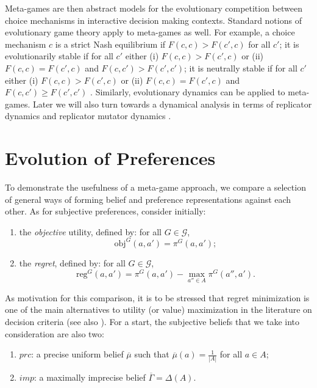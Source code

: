\documentclass[fleqn,reqno,12pt]{article}
\theoremstyle{Satz}
\theoremstyle{Bsp}
\begin{document}
Meta-games are then abstract models for the evolutionary competition between choice mechanisms
in interactive decision making contexts.  Standard notions of evolutionary game theory apply to
meta-games as well. For example, a choice mechanism $c$ is a strict Nash equilibrium if
$F(c,c) > F(c',c)$ for all $c'$; it is evolutionarily stable if for all $c'$ either (i)
$F(c,c) > F(c',c)$ or (ii) $F(c,c) = F(c',c)$ and $F(c,c') > F(c',c')$; it is neutrally stable
if for all $c'$ either (i) $F(c,c) > F(c',c)$ or (ii) $F(c,c) = F(c',c)$ and
$F(c,c') \ge F(c',c')$ \citep{Maynard-Smith1982:Evolution-and-t}. Similarly, evolutionary
dynamics can be applied to meta-games. Later we will also turn towards a dynamical analysis in terms of replicator dynamics
\citep{TaylorJonker1978:Evolutionary-St} and replicator mutator dynamics
\citep[e.g.,][]{Nowak2006:Evolutionary-Dy}.

\section{Evolution of Preferences} \label{sec:model}

To demonstrate the usefulness of a meta-game approach, we compare a
selection of general ways of forming belief and preference representations against each
other. As for subjective preferences, consider initially:
\begin{enumerate}
\item the \textit{objective} utility, defined by: for all $G \in \mathcal{G}$,
$$\text{obj}^G(a,a')=\pi^G(a,a');$$
\item the \textit{regret}, defined by: for all $G \in \mathcal{G}$,
$$\text{reg}^G(a,a') =\pi^G(a,a')- \max_{a''\in A} \pi^G(a'',a').$$
\end{enumerate}

As motivation for this comparison, it is to be stressed that regret minimization is one of the main alternatives to utility (or value) maximization in the literature on decision criteria (see also \cite{bleWakker15}).
For a start, the subjective beliefs that we take into consideration are also two:
\begin{enumerate}
\item $prc$: a precise uniform belief $\overline{\mu}$ such that $\overline{\mu}(a)=\frac{1}{|A|}$ for all $a\in A$;
\item $imp$: a maximally imprecise belief $\overline{\Gamma}=\Delta(A)$.
\end{enumerate}
\end{document}
